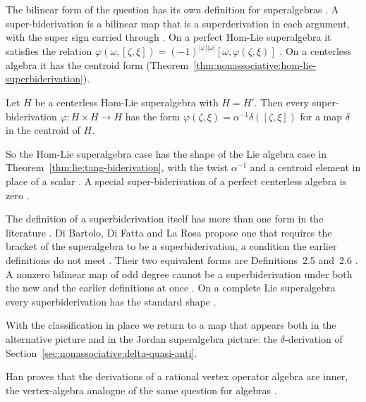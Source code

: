 The bilinear form of the question has its own definition for superalgebras
\cite[p.~2]{Pandey2024Superbiderivations}. A super-biderivation is a bilinear
map that is a superderivation in each argument, with the super sign carried
through \cite[p.~2]{Pandey2024Superbiderivations}. On a perfect Hom-Lie
superalgebra it satisfies the relation
$\varphi(\omega,[\zeta,\xi])=(-1)^{|\varphi||\omega|}[\omega,\varphi(\zeta,\xi)]$
\cite[Lemma~3.7, p.~7]{Pandey2024Superbiderivations}. On a centerless algebra
it has the centroid form
(Theorem~\ref{thm:nonassociative:hom-lie-superbiderivation}).

\begin{theorem}\label{thm:nonassociative:hom-lie-superbiderivation}
Let $H$ be a centerless Hom-Lie superalgebra with $H=H'$. Then every
super-biderivation $\varphi\colon H\times H\to H$ has the form
$\varphi(\zeta,\xi)=\alpha^{-1}\delta([\zeta,\xi])$ for a map $\delta$ in the
centroid of $H$.
\end{theorem}

So the Hom-Lie superalgebra case has the shape of the Lie algebra case in
Theorem~\ref{thm:lie:tang-biderivation}, with the twist $\alpha^{-1}$ and a
centroid element in place of a scalar
\cite[Theorem~3.8, p.~7]{Pandey2024Superbiderivations}. A special
super-biderivation of a perfect centerless algebra is zero
\cite[Theorem~3.10, p.~9]{Pandey2024Superbiderivations}.

The definition of a superbiderivation itself has more than one form in the
literature \cite[p.~2]{DiBartoloDiFattaLaRosa2025Super}. Di Bartolo, Di Fatta
and La Rosa propose one that requires the bracket of the superalgebra to be a
superbiderivation, a condition the earlier definitions do not meet
\cite[p.~2]{DiBartoloDiFattaLaRosa2025Super}. Their two equivalent forms are
Definitions~2.5 and~2.6 \cite[Definitions~2.5--2.6,
p.~5]{DiBartoloDiFattaLaRosa2025Super}. A nonzero bilinear map of odd degree
cannot be a superbiderivation under both the new and the earlier definitions
at once \cite[p.~7]{DiBartoloDiFattaLaRosa2025Super}. On a complete Lie
superalgebra every superbiderivation has the standard shape \cite[Theorem~3.6,
p.~10]{DiBartoloDiFattaLaRosa2025Super}.

With the classification in place we return to a map that appears both in
the alternative picture and in the Jordan superalgebra picture: the
$\delta$-derivation of Section~\ref{sec:nonassociative:delta-quasi-anti}.

Han proves that the derivations of a rational vertex operator algebra are
inner, the vertex-algebra analogue of the same question for algebras
\cite[Abstract, p.~1]{Han2026VOA}.

